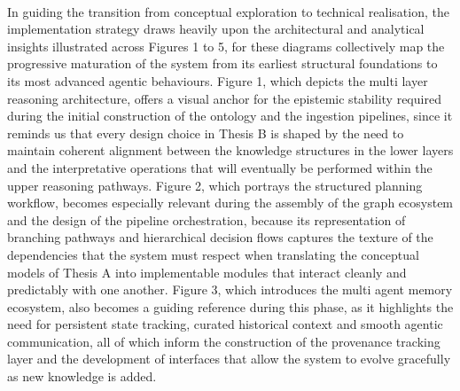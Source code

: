         \paragraph{}
        In guiding the transition from conceptual exploration to technical realisation, the implementation strategy draws heavily upon the architectural and analytical insights illustrated across Figures 1 to 5, for these diagrams collectively map the progressive maturation of the system from its earliest structural foundations to its most advanced agentic behaviours. Figure 1, which depicts the multi layer reasoning architecture, offers a visual anchor for the epistemic stability required during the initial construction of the ontology and the ingestion pipelines, since it reminds us that every design choice in Thesis B is shaped by the need to maintain coherent alignment between the knowledge structures in the lower layers and the interpretative operations that will eventually be performed within the upper reasoning pathways. Figure 2, which portrays the structured planning workflow, becomes especially relevant during the assembly of the graph ecosystem and the design of the pipeline orchestration, because its representation of branching pathways and hierarchical decision flows captures the texture of the dependencies that the system must respect when translating the conceptual models of Thesis A into implementable modules that interact cleanly and predictably with one another. Figure 3, which introduces the multi agent memory ecosystem, also becomes a guiding reference during this phase, as it highlights the need for persistent state tracking, curated historical context and smooth agentic communication, all of which inform the construction of the provenance tracking layer and the development of interfaces that allow the system to evolve gracefully as new knowledge is added.

        \newpage
